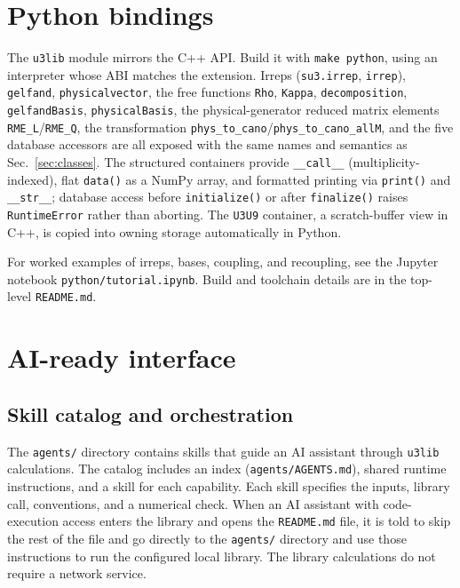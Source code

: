 \documentclass[aps,onecolumn,10pt,superscriptaddress,floatfix,nofootinbib]{revtex4}
\begin{document}
\section{Python bindings}
\label{sec:python}

The \verb|u3lib| module mirrors the C++ API. Build it with
\verb|make python|, using an interpreter whose ABI matches the extension. Irreps
(\verb|su3.irrep|, \verb|irrep|), \verb|gelfand|, \verb|physicalvector|, the free
functions \verb|Rho|, \verb|Kappa|, \verb|decomposition|, \verb|gelfandBasis|,
\verb|physicalBasis|, the physical-generator reduced matrix elements \verb|RME_L|/\verb|RME_Q|, the
transformation \verb|phys_to_cano|/\verb|phys_to_cano_allM|, and the five database
accessors are all exposed with the same names and semantics as
Sec.~\ref{sec:classes}. The structured containers provide
\verb|__call__| (multiplicity-indexed), flat \verb|data()| as a NumPy array, and
formatted printing via \verb|print()| and \verb|__str__|; database access before \verb|initialize()| or after
\verb|finalize()| raises \verb|RuntimeError| rather than aborting. The \verb|U3U9|
container, a scratch-buffer view in C++, is copied into owning storage
automatically in Python.

For worked examples of irreps, bases, coupling, and recoupling, see the Jupyter
notebook \verb|python/tutorial.ipynb|. Build and toolchain details are in the
top-level \verb|README.md|.

\section{AI-ready interface}
\label{sec:agents}

\subsection{Skill catalog and orchestration}

The \verb|agents/| directory contains skills that guide an AI assistant through
\texttt{u3lib} calculations. The catalog includes an index
(\verb|agents/AGENTS.md|), shared runtime instructions, and a skill for each
capability. Each skill specifies the inputs, library call, conventions, and a
numerical check. When an AI assistant with code-execution access enters the library
and opens the \texttt{README.md} file, it is told to skip the rest of the file and 
go directly to the \verb|agents/| directory and use those instructions
to run the configured local library. The library calculations do not require a
network service.
\end{document}
